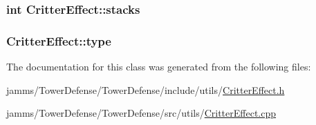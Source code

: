 \hypertarget{class_critter_effect_ad6b5573ff377524e3e434441a0cf8496}{
\subsubsection[{stacks}]{\setlength{\rightskip}{0pt plus 5cm}int Critter\+Effect\+::stacks\hspace{0.3cm}{\ttfamily [protected]}}}\label{class_critter_effect_ad6b5573ff377524e3e434441a0cf8496}
\hypertarget{class_critter_effect_a25a88f402fc725134ed7d6e3376ed1d1}{
\subsubsection[{type}]{ Critter\+Effect\+::type\hspace{0.3cm}{\ttfamily [protected]}}}\label{class_critter_effect_a25a88f402fc725134ed7d6e3376ed1d1}


The documentation for this class was generated from the following files\+:\begin{DoxyCompactItemize}
\item 
jamms/\+Tower\+Defense/\+Tower\+Defense/include/utils/\hyperlink{_critter_effect_8h}{Critter\+Effect.\+h}\item 
jamms/\+Tower\+Defense/\+Tower\+Defense/src/utils/\hyperlink{_critter_effect_8cpp}{Critter\+Effect.\+cpp}\end{DoxyCompactItemize}
